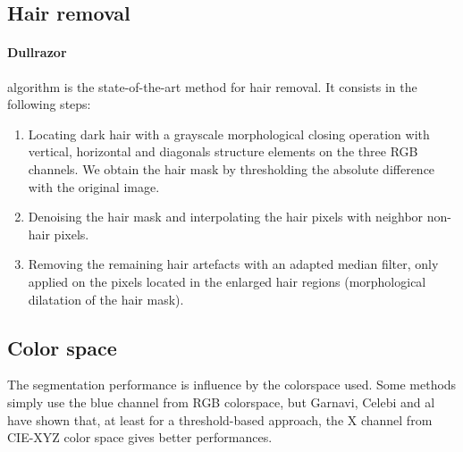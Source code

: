 \documentclass[a4paper,10pt]{article}
\begin{document}
\subsection{Hair removal}
\paragraph{Dullrazor~\cite{Dullrazor1997}} algorithm is the state-of-the-art method for hair removal. It consists in the following steps:
\begin{enumerate}
 \item Locating dark hair with a grayscale morphological closing operation with vertical, horizontal and diagonals structure elements on the three RGB channels. We obtain the hair mask by thresholding the absolute difference with the original image.
 \item Denoising the hair mask and interpolating the hair pixels with neighbor non-hair pixels. 
 \item Removing the remaining hair artefacts with an adapted median filter, only applied on the pixels located in the enlarged hair regions
 (morphological dilatation of the hair mask).
\end{enumerate}


\subsection{Color space}
The segmentation performance is influence by the colorspace used. Some methods  simply use the blue channel from RGB colorspace, but Garnavi, Celebi and al~\cite{Garnavi2010} have shown that, at least for a threshold-based approach, the X channel from CIE-XYZ color space gives better performances.



\end{document}
